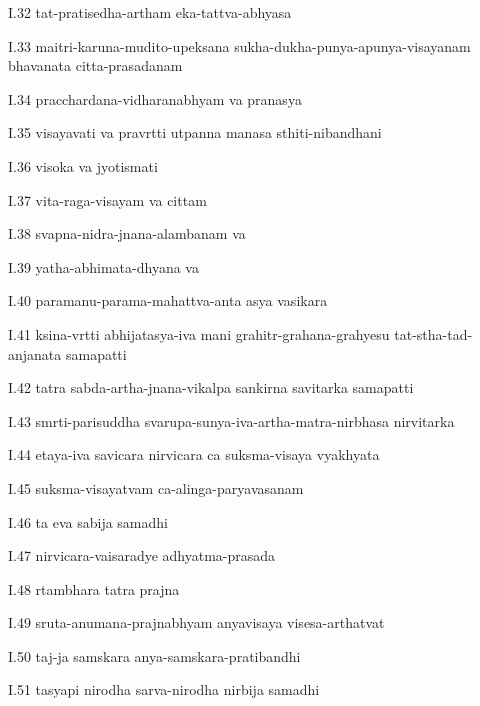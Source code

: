 I.32
tat-pratisedha-artham eka-tattva-abhyasa

I.33
maitri-karuna-mudito-upeksana sukha-dukha-punya-apunya-visayanam
bhavanata citta-prasadanam

I.34
pracchardana-vidharanabhyam va pranasya

I.35
visayavati va pravrtti utpanna manasa sthiti-nibandhani

I.36
visoka va jyotismati

I.37
vita-raga-visayam va cittam

I.38
svapna-nidra-jnana-alambanam va

I.39
yatha-abhimata-dhyana va

I.40
paramanu-parama-mahattva-anta asya vasikara

I.41
ksina-vrtti abhijatasya-iva mani
grahitr-grahana-grahyesu tat-stha-tad-anjanata samapatti

I.42
tatra sabda-artha-jnana-vikalpa sankirna savitarka samapatti

I.43
smrti-parisuddha svarupa-sunya-iva-artha-matra-nirbhasa nirvitarka

I.44
etaya-iva savicara nirvicara ca suksma-visaya vyakhyata

I.45
suksma-visayatvam ca-alinga-paryavasanam

I.46
ta eva sabija samadhi

I.47
nirvicara-vaisaradye adhyatma-prasada

I.48
rtambhara tatra prajna

I.49
sruta-anumana-prajnabhyam anyavisaya visesa-arthatvat

I.50
taj-ja samskara anya-samskara-pratibandhi

I.51
tasyapi nirodha sarva-nirodha nirbija samadhi
